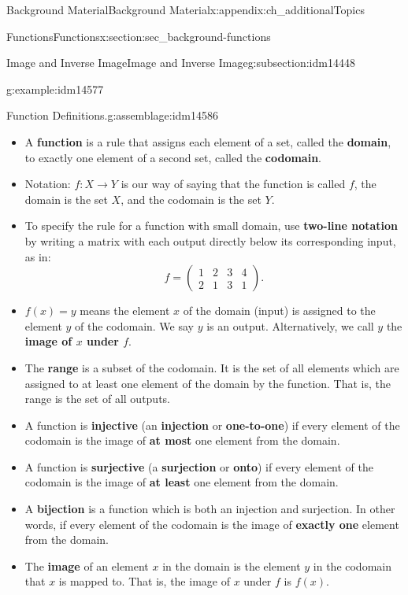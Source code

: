 \documentclass[oneside,10pt,]{book}
\newcommand{\terminology}[1]{\textbf{#1}}
\numberwithin{equation}{chapter}
\newcommand{\amp}{&}
\begin{document}
\begin{appendixptx}{Background Material}{}{Background Material}{}{}{x:appendix:ch_additionalTopics}
\begin{sectionptx}{Functions}{}{Functions}{}{}{x:section:sec_background-functions}
\begin{subsectionptx}{Image and Inverse Image}{}{Image and Inverse Image}{}{}{g:subsection:idm14448}
\begin{example}{}{g:example:idm14577}
\begin{equation*}
\end{equation*}
%
\end{example}
\begin{assemblage}{Function Definitions.}{g:assemblage:idm14586}%
%
\begin{itemize}[label=\textbullet]
\item{}A \terminology{function} is a rule that assigns each element of a set, called the \terminology{domain}, to exactly one element of a second set, called the \terminology{codomain}.%
\item{}Notation: \(f:X \to Y\) is our way of saying that the function is called \(f\), the domain is the set \(X\), and the codomain is the set \(Y\).%
\item{}To specify the rule for a function with small domain, use \terminology{two-line notation} by writing a matrix with each output directly below its corresponding input, as in:%
\begin{equation*}
f = \begin{pmatrix}1 \amp 2 \amp 3 \amp 4 \\ 2 \amp 1 \amp 3 \amp 1 \end{pmatrix}.
\end{equation*}
%
\item{}\(f(x) = y\) means the element \(x\) of the domain (input) is assigned to the element \(y\) of the codomain. We say \(y\) is an output. Alternatively, we call \(y\) the \terminology{image of \(x\) under \(f\)}.%
\item{}The \terminology{range} is a subset of the codomain. It is the set of all elements which are assigned to at least one element of the domain by the function. That is, the range is the set of all outputs.%
\item{}A function is \terminology{injective} (an \terminology{injection} or \terminology{one-to-one}) if every element of the codomain is the image of \terminology{at most} one element from the domain.%
\item{}A function is \terminology{surjective} (a \terminology{surjection} or \terminology{onto}) if every element of the codomain is the image of \terminology{at least} one element from the domain.%
\item{}A \terminology{bijection} is a function which is both an injection and surjection. In other words, if every element of the codomain is the image of \terminology{exactly one} element from the domain.%
\item{}The \terminology{image} of an element \(x\) in the domain is the element \(y\) in the codomain that \(x\) is mapped to.  That is, the image of \(x\) under \(f\) is  \(f(x)\).%

\end{itemize}
\end{assemblage}
\end{subsectionptx}
\end{sectionptx}
\end{appendixptx}
\end{document}
